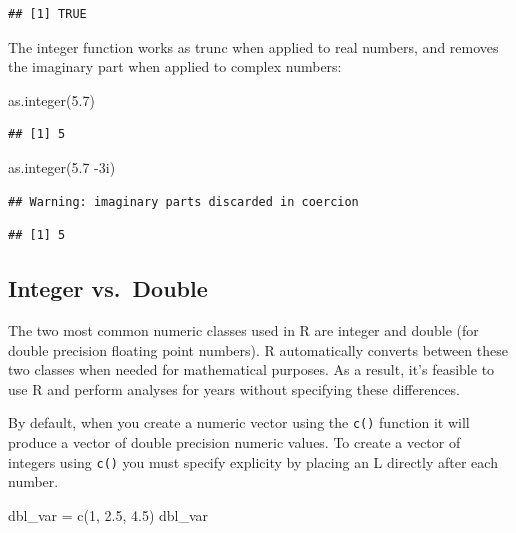 \documentclass[
]{book}
\newenvironment{Shaded}{\begin{snugshade}}{\end{snugshade}}
\newcommand{\DecValTok}[1]{\textcolor[rgb]{0.00,0.00,0.81}{#1}}
\newcommand{\FloatTok}[1]{\textcolor[rgb]{0.00,0.00,0.81}{#1}}
\newcommand{\FunctionTok}[1]{\textcolor[rgb]{0.00,0.00,0.00}{#1}}
\newcommand{\NormalTok}[1]{#1}
\newcommand{\OtherTok}[1]{\textcolor[rgb]{0.56,0.35,0.01}{#1}}
\newcommand{\SpecialCharTok}[1]{\textcolor[rgb]{0.00,0.00,0.00}{#1}}
\theoremstyle{definition}
\theoremstyle{definition}
\theoremstyle{definition}
\theoremstyle{definition}
\theoremstyle{remark}
\begin{document}
\begin{verbatim}
## [1] TRUE
\end{verbatim}

The integer function works as trunc when applied to real numbers, and removes the imaginary part when
applied to complex numbers:

\begin{Shaded}
\begin{Highlighting}[]
\FunctionTok{as.integer}\NormalTok{(}\FloatTok{5.7}\NormalTok{)}
\end{Highlighting}
\end{Shaded}

\begin{verbatim}
## [1] 5
\end{verbatim}

\begin{Shaded}
\begin{Highlighting}[]
\FunctionTok{as.integer}\NormalTok{(}\FloatTok{5.7} \SpecialCharTok{{-}}\NormalTok{3i)}
\end{Highlighting}
\end{Shaded}

\begin{verbatim}
## Warning: imaginary parts discarded in coercion
\end{verbatim}

\begin{verbatim}
## [1] 5
\end{verbatim}

\hypertarget{integer-vs.-double}{%
\subsection{Integer vs.~Double}\label{integer-vs.-double}}

The two most common numeric classes used in R are integer and double (for double precision floating point numbers). R automatically converts between these two classes when needed for mathematical purposes. As a result, it's feasible to use R and perform analyses for years without specifying these differences.

By default, when you create a numeric vector using the \texttt{c()} function it will produce a vector of double precision numeric values. To create a vector of integers using \texttt{c()} you must specify explicity by placing an L directly after each number.

\begin{Shaded}
\begin{Highlighting}[]
\NormalTok{dbl\_var }\OtherTok{=} \FunctionTok{c}\NormalTok{(}\DecValTok{1}\NormalTok{, }\FloatTok{2.5}\NormalTok{, }\FloatTok{4.5}\NormalTok{)}
\NormalTok{dbl\_var}
\end{Highlighting}
\end{Shaded}
\end{document}
